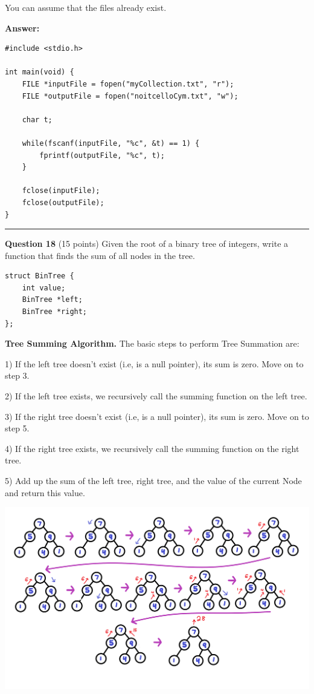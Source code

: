 \documentclass{exam}
\begin{document}
You can assume that the files already exist.

\textbf{Answer:}

\begin{lstlisting}
#include <stdio.h>

int main(void) {
	FILE *inputFile = fopen("myCollection.txt", "r");
	FILE *outputFile = fopen("noitcelloCym.txt", "w");

	char t;
	
	while(fscanf(inputFile, "%c", &t) == 1) {
		fprintf(outputFile, "%c", t);
	}

	fclose(inputFile);
	fclose(outputFile);
}
\end{lstlisting}

\newpage




\begin{center}\noindent\rule{6in}{0.4pt}\end{center}

\textbf{Question 18} (15 points) Given the root of a binary tree of integers, write a function that finds the sum of all nodes in the tree.

\begin{lstlisting}
struct BinTree {
	int value;
	BinTree *left;
	BinTree *right;
};
\end{lstlisting}

\textbf{Tree Summing Algorithm.} The basic steps to perform Tree Summation are:

1) If the left tree doesn't exist (i.e, is a null pointer), its sum is zero. Move on to step 3.

2) If the left tree exists, we recursively call the summing function on the left tree.

3) If the right tree doesn't exist (i.e, is a null pointer), its sum is zero. Move on to step 5.

4) If the right tree exists, we recursively call the summing function on the right tree.

5) Add up the sum of the left tree, right tree, and the value of the current Node and return this value.

\includegraphics[scale=0.2]{tree}
\end{document}
